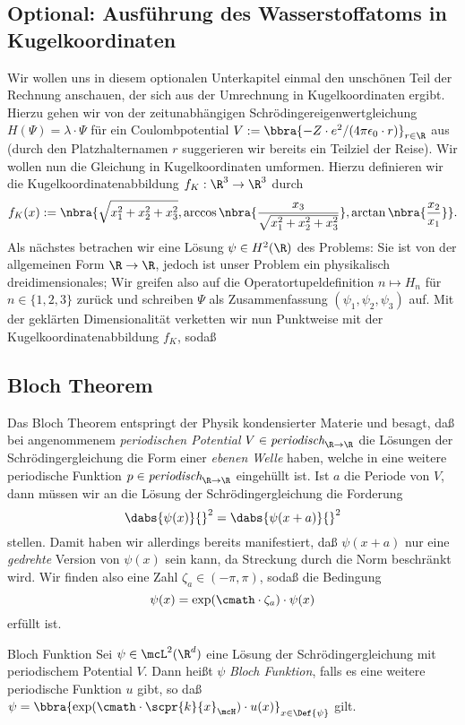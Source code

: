 \documentclass{subfiles}
\begin{document}
    \subsection*{Optional: Ausführung des Wasserstoffatoms in Kugelkoordinaten}
        Wir wollen uns in diesem optionalen Unterkapitel einmal den unschönen Teil der Rechnung anschauen, der sich aus der Umrechnung in Kugelkoordinaten ergibt. Hierzu gehen wir von der zeitunabhängigen Schrödingereigenwertgleichung $H(\Psi) = \lambda\cdot\Psi$ für ein Coulombpotential $V := \bbra{-Z\cdot e^2/(4\pi\epsilon_0\cdot r)}_{r\in\R}$ aus (durch den Platzhalternamen $r$ suggerieren wir bereits ein Teilziel der Reise). Wir wollen nun die Gleichung in Kugelkoordinaten umformen. Hierzu definieren wir die Kugelkoordinatenabbildung $f_K:\R^3\to\R^3$ durch 
        \[
            f_K(x) := \nbra{\sqrt{x_1^2 + x_2^2 + x_3^2},\arccos\nbra{\frac{x_3}{\sqrt{x_1^2 + x_2^2 + x_3^2}}},\arctan\nbra{\frac{x_2}{x_1}}}.
        \]
        Als nächstes betrachen wir eine Lösung $\psi\in H^2(\R)$ des Problems: Sie ist von der allgemeinen Form $\R\to\R$, jedoch ist unser Problem ein physikalisch dreidimensionales; Wir greifen also auf die Operatortupeldefinition $n\mapsto H_n$ für $n\in\{1,2,3\}$ zurück und schreiben $\Psi$ als Zusammenfassung $(\psi_1,\psi_2,\psi_3)$ auf. Mit der geklärten Dimensionalität verketten wir nun Punktweise mit der Kugelkoordinatenabbildung $f_K$, sodaß 


        
        
    \subsection*{Bloch Theorem}
        Das Bloch Theorem entspringt der Physik kondensierter Materie und besagt, daß bei angenommenem \emph{periodischen Potential} $V\in\textit{periodisch}_{\R\to\R}$ die Lösungen der Schrödingergleichung die Form einer \emph{ebenen Welle} haben, welche in eine weitere periodische Funktion $p\in\textit{periodisch}_{\R\to\R}$ eingehüllt ist. Ist $a$ die Periode von $V$, dann müssen wir an die Lösung der Schrödingergleichung die Forderung
        \[\dabs{\psi(x)}{}^2 = \dabs{\psi(x + a)}{}^2\]
        stellen. Damit haben wir allerdings bereits manifestiert, daß $\psi(x + a)$ nur eine \emph{gedrehte} Version von $\psi(x)$ sein kann, da Streckung durch die Norm beschränkt wird. Wir finden also eine Zahl $\zeta_a\in(-\pi,\pi)$, sodaß die Bedingung
        \[\psi(x) = \exp(\cmath\cdot\zeta_a)\cdot\psi(x)\]
        erfüllt ist. 
        \begin{mdef}{Bloch Funktion}
            Sei $\psi\in\mcL^2(\R^d)$ eine Lösung der Schrödingergleichung mit periodischem Potential $V$. Dann heißt $\psi$ \emph{Bloch Funktion}, falls es eine weitere periodische Funktion $u$ gibt, so daß $\psi = \bbra{\exp(\cmath\cdot\scpr{k}{x}_\mcH)\cdot u(x)}_{x\in\Def{\psi}}$ gilt.
        \end{mdef}
        
        
\end{document}
